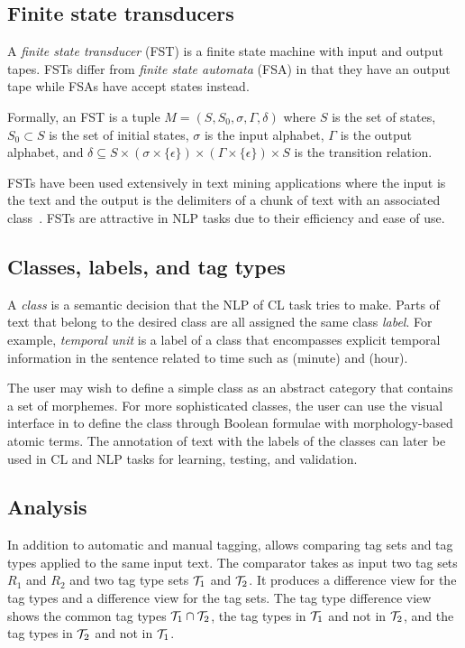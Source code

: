 \subsection{Finite state transducers}

A {\em finite state transducer} (FST) is a finite state machine with input and output tapes. 
FSTs differ from {\em finite state automata} (FSA) in that
they have an output tape while FSAs have accept states instead.

Formally, an FST is a tuple $M = (S,S_{0},\sigma,\varGamma,\delta)$ where $S$ is the set of states,
$S_{0} \subset S$ is the set of initial states, 
$\sigma$ is the input alphabet, 
$\varGamma$ is the output alphabet, 
and $\delta \subseteq S \times (\sigma \times \{\epsilon\}) \times (\varGamma \times \{\epsilon\}) \times S$ is the transition relation.

FSTs have been used extensively in text mining applications where the input is the text and the output is the
delimiters of a chunk of text with an associated class~\cite{beesley2001finite}. 
FSTs are attractive in NLP tasks due to their efficiency and ease of use.

\subsection{Classes, labels, and tag types}

A {\em class} is a semantic decision that the NLP of CL task tries to make. 
Parts of text that belong to the desired class are all assigned the same class {\em label}. 
For example, {\em temporal unit} is a label of a class that encompasses explicit temporal 
information in the sentence related to time such as 
 (minute) and  (hour). 

The user may wish to define a simple class as an abstract category that contains a 
set of morphemes. 
For more sophisticated classes, the user can use the visual interface in \framework to 
define the class through Boolean formulae with morphology-based atomic terms. 
The annotation of text with the labels of the classes can later be used in 
CL and NLP tasks for learning, testing, and validation.

\subsection{Analysis}

In addition to automatic and manual tagging, \framework 
allows comparing tag sets and tag types applied to the
same input text. 
The \framework comparator takes as input two tag sets $R_1$ and $R_2$ and 
two tag type sets ${\cal T}_1$ and ${\cal T}_2$. 
It produces a difference view for the tag types and 
a difference view for the tag sets. 
The tag type difference view shows the common tag types ${\cal T}_1 \cap {\cal T}_2$,
the tag types in ${\cal T}_1$ and not in ${\cal T}_2$, 
and the tag types in ${\cal T}_2$ and not in ${\cal T}_1$.


